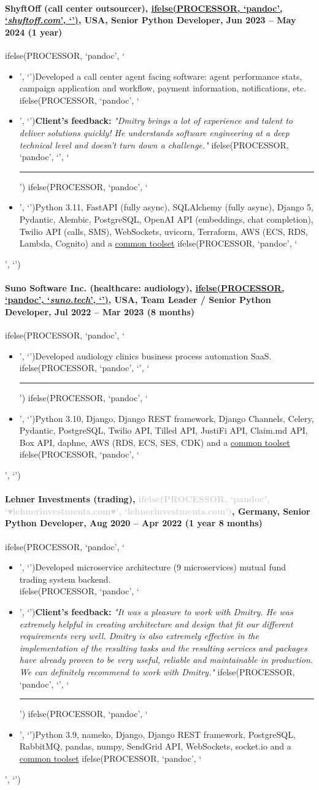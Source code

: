 \documentclass[a4paper,8pt]{extarticle}
\newcommand{\chref}[2]{\href{#1}
{ifelse(PROCESSOR, `pandoc', `#2', `\underline{\smash{#2}}')}}
\newcommand{\itchref}[2]{\chref{#1}{\textit{#2}}}  %
\newcommand{\chrule}{ifelse(PROCESSOR, `pandoc', `', `\vspace{3pt}\hrule')}
\newcommand{\brokenhreflg}[1]{\textcolor{lightgray}{ifelse(PROCESSOR, `pandoc', `♥#1♥', `#1')}}
\newcommand{\pdbeginitemize}{ifelse(PROCESSOR, `pandoc', `\begin{itemize}', `')}
\newcommand{\pditem}{ifelse(PROCESSOR, `pandoc', `\item', `')}
\newcommand{\pdenditemize}{ifelse(PROCESSOR, `pandoc', `\end{itemize}', `')}
\begin{document}
\paragraph*{ShyftOff (call center outsourcer), \itchref{https://shyftoff.com}{shyftoff.com}, USA, Senior Python Developer, Jun 2023 -- May 2024 (1 year)}
\pdbeginitemize
\pditem Developed a call center agent facing software: agent performance stats, campaign application and workflow, payment information, notifications, etc.\\
\pditem \textbf{Client's feedback:} \textit{"Dmitry brings a lot of experience and talent to deliver solutions quickly! He understands software engineering at a deep technical level and doesn't turn down a challenge."}
\chrule
\pditem Python 3.11, FastAPI (fully async), SQLAlchemy (fully async), Django 5, Pydantic, Alembic, PostgreSQL, OpenAI API (embeddings, chat completion), Twilio API (calls, SMS), WebSockets, uvicorn, Terraform, AWS (ECS, RDS, Lambda, Cognito) and a \hyperlink{common-toolset}{common toolset}
\pdenditemize

\pagebreak

\paragraph*{Suno Software Inc. (healthcare: audiology), \itchref{https://suno.tech}{suno.tech}, USA, Team Leader / Senior Python Developer, Jul 2022 -- Mar 2023 (8 months)}
\pdbeginitemize
\pditem Developed audiology clinics business process automation SaaS.
\chrule
\pditem Python 3.10, Django, Django REST framework, Django Channels, Celery, Pydantic, PostgreSQL, Twilio API, Tilled API, JustiFi API, Claim.md API, Box API, daphne, AWS (RDS, ECS, SES, CDK) and a \hyperlink{common-toolset}{common toolset}
\pdenditemize

\paragraph*{Lehner Investments (trading), \brokenhreflg{lehnerinvestments.com}, Germany, \textbf{Senior Python Developer}, Aug 2020 -- Apr 2022 (1 year 8 months)}
\pdbeginitemize
\pditem Developed microservice architecture (9 microservices) mutual fund trading system backend.\\
\pditem \textbf{Client's feedback:} \textit{"It was a pleasure to work with Dmitry. He was extremely helpful in creating architecture and design that fit our different requirements very well. Dmitry is also extremely effective in the implementation of the resulting tasks and the resulting services and packages have already proven to be very useful, reliable and maintainable in production. We can definitely recommend to work with Dmitry."}
\chrule
\pditem Python 3.9, nameko, Django, Django REST framework, PostgreSQL, RabbitMQ, pandas, numpy, SendGrid API, WebSockets, socket.io and a \hyperlink{common-toolset}{common toolset}
\pdenditemize
\end{document}
